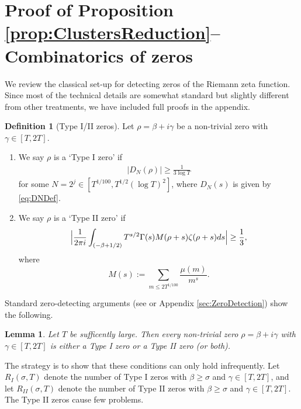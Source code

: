 \documentclass[12pt]{amsart}
\theoremstyle{plain}
\newtheorem{lemma}[theorem]{Lemma}
\theoremstyle{definition}
\newtheorem{definition}[theorem]{Definition}
\theoremstyle{remark}
\begin{document}
\section{Proof of Proposition \ref{prop:ClustersReduction}--Combinatorics of zeros}
%
%
%
%
We review the classical set-up for detecting zeros of the Riemann zeta function. Since most of the technical details are somewhat standard but slightly different from other treatments, we have included full proofs in the appendix.
%
%
%
%
\begin{definition}[Type I/II zeros] Let $\rho=\beta+i\gamma$ be a non-trivial zero with $\gamma\in [T,2T]$.
\begin{enumerate}
\item We say $\rho$ is a `Type I zero' if
\begin{align}\label{eq:TypeICondition}
|D_N(\rho)|\geq \frac{1}{3\log{T}}
\end{align}
for some $N=2^j\in [T^{1/100},T^{1/2}(\log{T})^2]$, where $D_N(s)$ is given by \eqref{eq:DNDef}.
\item We say $\rho$ is a `Type II zero' if
\begin{align}\label{eq:Type II zero condition}
\Bigl|\frac{1}{2\pi i} \int_{(-\beta + 1/2)} T^{s/2} \Gamma(s) M(\rho+s)\zeta(\rho+s) ds\Bigr| \geq \frac{1}{3},
\end{align}
where 
\[
M(s) := \sum_{m \leq 2T^{1/100}} \frac{\mu(m)}{m^s}.
\]
\end{enumerate}
\end{definition}
%
%
%
%
Standard zero-detecting arguments (see \cite[Chapter 12]{Mon1971} or Appendix \ref{sec:ZeroDetection}) show the following.
%
%
%
%
\begin{lemma}\label{lmm:TypeIIIZeros}
Let $T$ be sufficently large. Then every non-trivial zero $\rho=\beta+i\gamma$ with $\gamma\in[T,2T]$ is either a Type I zero or a Type II zero (or both).
\end{lemma}
%
%
%
%
The strategy is to show that these conditions can only hold infrequently. Let $R_I(\sigma,T)$ denote the number of Type I zeros with $\beta \geq \sigma$ and $\gamma\in[T,2T]$, and let $R_{II}(\sigma,T)$ denote the number of Type II zeros with $\beta \geq \sigma$ and $\gamma\in[T,2T]$. The Type II zeros cause few problems.
%
%
\end{document}
